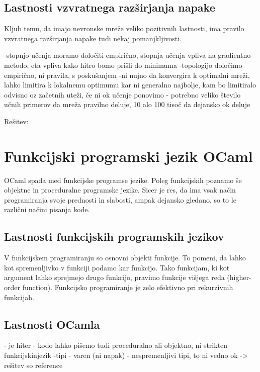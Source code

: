 \documentclass[mat1]{fmfdelo}
\begin{document}
%
\begin{equation*}
\end{equation*}
%

\subsection{Lastnosti vzvratnega razširjanja napake}
Kljub temu, da imajo nevronske mreže veliko pozitivnih lastnosti, ima pravilo vzvratnega razširjanja napake tudi nekaj pomanjkljivosti.
  
-stopnjo učenja moramo določiti empirično, stopnja učenja vpliva na gradientno metodo, eta vpliva kako hitro bomo prišli do minimuma 
-topologijo določimo empirično, ni pravila, s poskušanjem
-ni nujno da konvergira k optimalni mreži, lahko limitira k lokalnemu optimumu kar ni generalno najbolje, kam bo limitiralo odvisno oz začetnih uteži, če ni ok učenje ponovimo
- potrebno veliko število učnih primerov da mreža pravilno deluje, 10 alo 100 tisoč da dejansko ok deluje

Rešitev: 

\section{Funkcijski programski jezik OCaml}
OCaml spada med funkcijske programse jezike. Poleg funkcijskih poznamo še objektne in proceduralne programske jezike. Sicer je res, da ima  vsak način programiranja svoje prednosti in slabosti, ampak dejansko gledano, so to le različni načini pisanja kode.

\subsection{Lastnosti funkcijskih programskih jezikov}
V funkcijskem programiranju so osnovni objekti funkcije. To pomeni, da lahko kot spremenljivko v funkciji podamo kar funkcijo. Tako funkcijam, ki kot argument lahko sprejmejo drugo funkcijo, pravimo funkcije višjega reda (higher-order function). Funkcijsko programiranje je zelo efektivno pri rekurzivnih funkcijah. 


\subsection{Lastnosti OCamla}

- je hiter
- kodo lahko pišemo tudi proceduralno ali objektno, ni strikten funkcijskinjezik
-tipi
- varen (ni napak)
- nespremenljivi tipi, to ni vedno ok -> rešitev so reference
\end{document}
